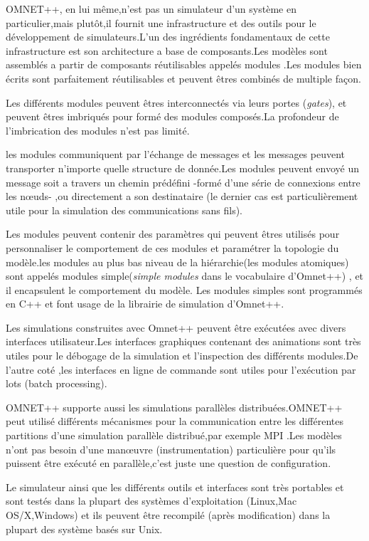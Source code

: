 OMNET++, en lui même,n'est pas un simulateur d'un système en particulier,mais plutôt,il fournit une infrastructure et des outils pour le développement de simulateurs.L'un des ingrédients fondamentaux de cette infrastructure est son architecture a base de composants.Les modèles sont assemblés a partir de composants réutilisables appelés modules .Les modules bien écrits sont parfaitement réutilisables et peuvent êtres combinés de multiple façon. 

Les différents modules peuvent êtres interconnectés via leurs portes (\emph{gates}), et peuvent êtres imbriqués pour formé des modules composés.La profondeur de l'imbrication des modules n'est pas limité.

les modules communiquent par l'échange de messages et les messages peuvent transporter n'importe quelle structure de donnée.Les modules peuvent envoyé un message soit a travers un chemin prédéfini -formé d'une série de connexions entre les nœuds- ,ou directement a son destinataire (le dernier cas est particulièrement utile pour la simulation des communications sans fils).

Les modules peuvent contenir des paramètres qui peuvent êtres utilisés pour personnaliser le comportement de ces modules et paramétrer la topologie du modèle.les modules au plus bas niveau de la hiérarchie(les modules atomiques) sont appelés modules simple(\emph{simple modules} dans le vocabulaire d'Omnet++) , et il encapsulent le comportement du modèle. Les modules simples sont programmés en C++ et font usage de la librairie de simulation d'Omnet++.

Les simulations construites avec Omnet++ peuvent être exécutées avec divers interfaces utilisateur.Les interfaces graphiques contenant des animations sont très utiles pour le débogage de la simulation et l'inspection des différents modules.De l'autre coté ,les interfaces en ligne de commande sont utiles pour l'exécution par lots (batch processing).

OMNET++ supporte aussi les simulations parallèles distribuées.OMNET++ peut utilisé différents mécanismes pour la communication entre les différentes partitions d'une simulation parallèle distribué,par exemple MPI .Les modèles n'ont pas besoin d'une manœuvre (instrumentation) particulière  pour qu'ils puissent être exécuté en parallèle,c'est juste une question de configuration.
 
Le simulateur ainsi que les différents outils et interfaces sont très portables et sont testés dans la plupart des systèmes  d'exploitation (Linux,Mac OS/X,Windows) et ils peuvent être recompilé (après modification) dans la plupart des système basés sur Unix.

